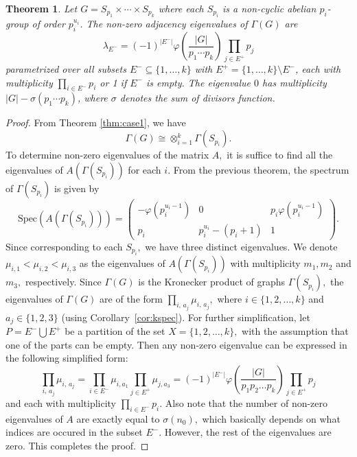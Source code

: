 \documentclass[11pt]{article}
\def \Ga {{\Gamma}}
\newtheorem{theorem}{Theorem}[section]
\begin{document}
\begin{theorem}\label{thm:Acase}
    Let $G = S_{p_1} \times \cdots \times S_{p_k}$ where each $S_{p_i}$ 
    is a non-cyclic abelian $p_i$-group of order $p_i^{u_i}$. The 
    non-zero adjacency eigenvalues of $\Gamma(G)$ are
    $$\lambda_{E^-} = (-1)^{|E^-|}\varphi\!\left(\frac{|G|}{p_1\cdots 
    p_k}\right)\prod_{j \in E^+} p_j$$
    parametrized over all subsets $E^- \subseteq \{1,\ldots,k\}$ with 
    $E^+ = \{1,\ldots,k\} \setminus E^-$, each with multiplicity 
    $\prod_{i \in E^-} p_i$ or 1 if $E^-$ is empty. The eigenvalue $0$ has multiplicity 
    $|G| - \sigma(p_1 \cdots p_k)$, where $\sigma$ denotes the sum of 
    divisors function.
    \end{theorem}
\begin{proof}
    From Theorem \ref{thm:case1}, we have $$\Ga(G)\cong \otimes_{i=1}^k \Ga(S_{p_i}).$$ 
To determine non-zero eigenvalues of the matrix $A,$ it is suffice to find all the eigenvalues of $A(\Ga(S_{p_i}))$ for each $i.$ From the previous theorem, the spectrum of $\Ga(S_{p_i})$ is given by
\begin{equation*}
    \mathrm{Spec}(A(\Ga(S_{p_i})))=
    \begin{pmatrix}-\varphi(p_i^{u_i-1})&0&p_i\varphi(p_i^{u_i-1})\\ p_i&p_i^{u_i}-(p_i+1)&1\end{pmatrix}.
\end{equation*}
Since corresponding to each $S_{p_i},$ we have three distinct eigenvalues. We denote $\mu_{i,1}<\mu_{i,2}<\mu_{i,3}$ as the eigenvalues of $A(\Ga(S_{p_i}))$ with multiplicity $m_1,m_2$ and $m_3,$ respectively. 
Since $\Gamma(G)$  is the Kronecker product of graphs $\Ga(S_{p_i}),$ the eigenvalues of $\Ga(G)$ are of the form
 $\prod\limits_{i,\,a_j} \mu_{i,\,a_j},$ where $i\in\{1,2,\dots, k\}$ and $ a_j\in \{1,2,3\}$ (using Corollary~\ref{cor:kspec}). For further simplification, let $P=E^-\bigcup E^+$ be a partition of the set $X=\{1,2,\dots,k\},$ with the assumption that one of the parts can be empty. Then any non-zero eigenvalue can be expressed in the following simplified form:
$$\prod\limits_{i,\,a_j} \mu_{i,\,a_j}=\prod_{i\in E^-}\mu_{i,a_1}\prod_{j\in E^+} \mu_{j,a_3}=(-1)^{\left|E^-\right|} \varphi\left(\dfrac{|G|}{p_1p_2\dots p_k}\right)\prod\limits_{j\in E^+}p_j$$
and each with multiplicity  $\prod\limits_{i\in E^-}p_i.$ 
Also note that the number of non-zero eigenvalues of $A$ are exactly equal to $\sigma(n_0),$ which basically depends on what indices are occured in the subset $E^-.$ However, the rest of the eigenvalues are zero. This completes the proof.
\end{proof}
\end{document}
